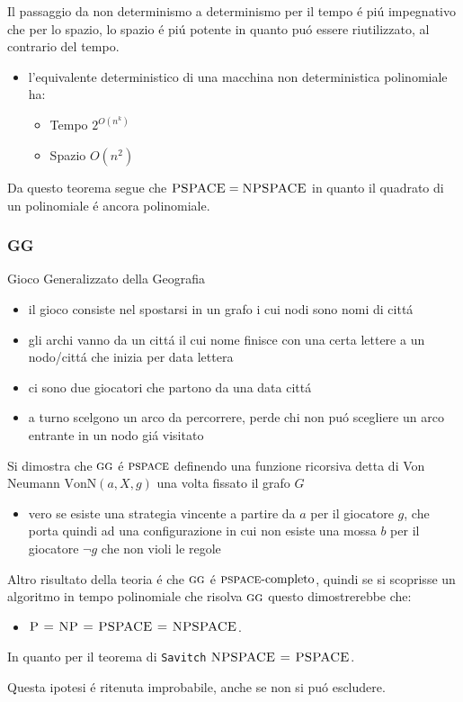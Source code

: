 \documentclass[
                        12pt, %
                        a4paper, %
                        oneside, %
                        headinclude,footinclude, %
                        BCOR5mm, %
                  ]{scrartcl}
\begin{document}
Il passaggio da non determinismo a determinismo per il tempo é piú impegnativo che per lo spazio, lo spazio é piú potente in quanto puó essere riutilizzato, al contrario del tempo.
\begin{itemize}
\item l'equivalente deterministico di una macchina non deterministica polinomiale ha:
\begin{itemize}
\item Tempo \(2^{O(n^k)}\)
\item Spazio \(O(n^2)\)
\end{itemize}
\end{itemize}

Da questo teorema segue che \(\textsc{PSPACE} =  \textsc{NPSPACE}\) in quanto il quadrato di un polinomiale é ancora polinomiale.
\subsubsection{GG}
\label{sec:org3bbd9c9}
Gioco Generalizzato della Geografia
\begin{itemize}
\item il gioco consiste nel spostarsi in un grafo i cui nodi sono nomi di cittá
\item gli archi vanno da un cittá il cui nome finisce con una certa lettere a un nodo/cittá che inizia per data lettera
\item ci sono due giocatori che partono da una data cittá
\item a turno scelgono un arco da percorrere, perde chi non puó scegliere un arco entrante in un nodo giá visitato
\end{itemize}

Si dimostra che \(\textsc{gg}\) é \(\textsc{pspace}\) definendo una funzione ricorsiva detta di Von Neumann \(\text{VonN}(a,X,g)\) una volta fissato il grafo \(G\)
\begin{itemize}
\item vero se esiste una strategia vincente a partire da \(a\) per il giocatore \(g\), che porta quindi ad una configurazione in cui non esiste una mossa \(b\) per il giocatore \(\lnot g\) che non violi le regole
\end{itemize}

Altro risultato della teoria é che \(\textsc{gg}\) é \(\textsc{pspace}\text{-completo}\), quindi se si scoprisse un algoritmo in tempo polinomiale che risolva \(\textsc{gg}\) questo dimostrerebbe che:
\begin{itemize}
\item \(\textsc{P = NP = PSPACE = NPSPACE}\).
\end{itemize}

In quanto per il teorema di \texttt{Savitch} \(\textsc{NPSPACE = PSPACE}\).

Questa ipotesi é ritenuta improbabile, anche se non si puó escludere.
\end{document}
